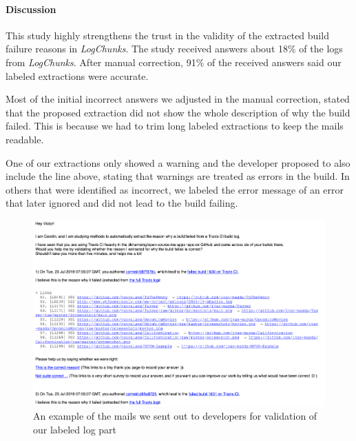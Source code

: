 \documentclass[\myrootdir/main.tex]{subfiles}
\begin{document}
\paragraph{Discussion}
This study highly strengthens the trust in the validity of the extracted build failure reasons in \emph{LogChunks}.
The study received answers about 18\% of the logs from \emph{LogChunks}.
After manual correction, 91\% of the received answers said our labeled extractions were accurate.

Most of the initial incorrect answers we adjusted in the manual correction, stated that the proposed extraction did not show the whole description of why the build failed.
This is because we had to trim long labeled extractions to keep the mails readable.

One of our extractions only showed a warning and the developer proposed to also include the line above, stating that warnings are treated as errors in the build.
In others that were identified as incorrect, we labeled the error message of an error that later ignored and did not lead to the build failing.

\begin{figure}[h]
	\centering
	\includegraphics[width=\textwidth, clip]{img/dev-mail.png}
	\caption{An example of the mails we sent out to developers for validation of our labeled log part}
	\label{fig:dev-mail}
\end{figure}
\end{document}

